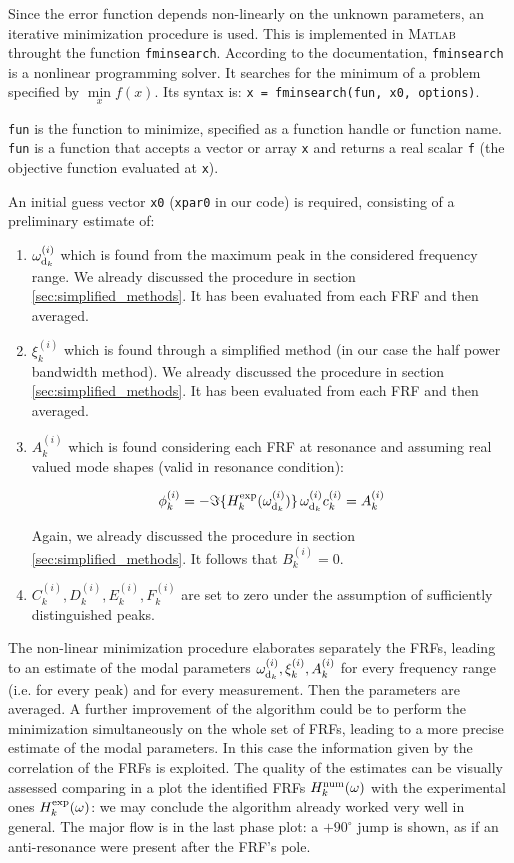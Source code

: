 \documentclass[a4paper,12pt,oneside]{article}
\begin{document}
Since the error function depends non-linearly on the unknown parameters, an iterative
minimization procedure is used. This is implemented in \textsc{Matlab} throught the function \lstinline!fminsearch!. According to the documentation, \lstinline!fminsearch! is a nonlinear programming solver. It searches for the minimum of a problem specified by $ \min\limits_x f(x) $. Its syntax is: \lstinline!x = fminsearch(fun, x0, options)!.

\lstinline!fun! is the function to minimize, specified as a function handle or function name. \lstinline!fun! is a function that accepts a vector or array \lstinline!x! and returns a real scalar \lstinline!f! (the objective function evaluated at \lstinline!x!).

An initial guess vector \lstinline!x0! (\lstinline!xpar0! in our code) is required, consisting of a preliminary estimate of:

\begin{enumerate}
	\item $ \omega_{\textup{d}_k}^{(i)} $ which is found from the maximum peak in the considered frequency range. We already discussed the procedure in section \ref{sec:simplified_methods}. It has been evaluated from each FRF and then averaged.
	\item $ \xi_k^{(i)} $ which is found through a simplified method (in our case the half power bandwidth method). We already discussed the procedure in section \ref{sec:simplified_methods}. It has been evaluated from each FRF and then averaged.
	\item $ A_k^{(i)} $ which is found considering each FRF at resonance and assuming real valued mode shapes (valid in resonance condition):

\[
	\phi^{(i)}_k =
		- \Im\{H^{\textup{exp}}_k(\omega_{\textup{d}_k}^{(i)})\} \,
		\omega_{\textup{d}_k}^{(i)} c^{(i)}_k	= A^{(i)}_k
\]

Again, we already discussed the procedure in section \ref{sec:simplified_methods}.
It follows that $ B^{(i)}_k = 0 $.
	\item $C^{(i)}_k , D^{(i)}_k, E^{(i)}_k, 	F^{(i)}_k $ are set to zero under the assumption of sufficiently distinguished peaks.
\end{enumerate}

The non-linear minimization procedure elaborates separately the FRFs, leading to an estimate of the modal parameters $ \omega_{\textup{d}_k}^{(i)}, \xi_k^{(i)}, A_k^{(i)} $ for every frequency range (i.e. for every peak) and for every measurement. Then the parameters are averaged. 
A further improvement of the algorithm could be to perform the minimization simultaneously on the whole set of FRFs, leading to a more precise estimate of the modal parameters. In this case the information given by the correlation of the FRFs is exploited. The quality of the estimates can be visually assessed comparing in a plot the identified FRFs $ H^\textup{num}_k(\omega) $ with the experimental ones $ H^\textup{exp}_k(\omega) $: we may conclude the algorithm already worked very well in general. The major flow is in the last phase plot: a $ +90^\circ $ jump is shown, as if an anti-resonance were present after the FRF's pole.
\end{document}
